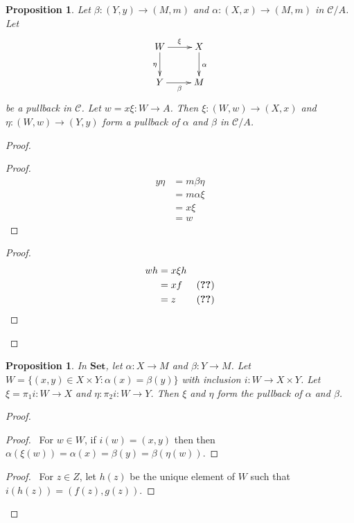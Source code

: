 \documentclass{book}
\let\qed\relax
\newtheorem{prop}[ax]{Proposition}
\theoremstyle{definition}
\newcommand{\Set}{\ensuremath{\mathbf{Set}}}
\begin{document}
\begin{prop}
\label{prop:pullback_slice_over}
Let $\beta : (Y,y) \rightarrow (M,m)$ and $\alpha : (X,x) \rightarrow (M,m)$ in $\mathcal{C} / A$. Let
\[ \xymatrix{
W \ar[r]^\xi \ar[d]_\eta & X \ar[d]^\alpha \\
Y \ar[r]_\beta & M
} \]
be a pullback in $\mathcal{C}$. Let $w = x\xi : W \rightarrow A$. Then $\xi : (W,w) \rightarrow (X,x)$ and $\eta : (W,w) \rightarrow (Y,y)$ form a pullback of $\alpha$ and $\beta$ in $\mathcal{C} / A$.
\end{prop}

\begin{proof}
\pf
{}
\begin{proof}
	\pf
	\begin{align*}
		y \eta & = m \beta \eta \\
		& = m \alpha \xi \\
		& = x \xi \\
		& = w
	\end{align*}
\end{proof}
\begin{proof}
	\pf
	\begin{align*}
		w h & = x \xi h \\
		& = xf & (\text{\stepref{4}}) \\
		& = z & (\text{\stepref{3}})
	\end{align*}
\end{proof}
\qed
\end{proof}

\begin{prop}
In $\Set$, let $\alpha : X \rightarrow M$ and $\beta : Y \rightarrow M$. Let $W = \{ (x,y) \in X \times Y : \alpha(x) = \beta(y) \}$ with inclusion $i : W \rightarrow X \times Y$. Let $\xi = \pi_1 i : W \rightarrow X$ and $\eta : \pi_2 i : W \rightarrow Y$. Then $\xi$ and $\eta$ form the pullback of $\alpha$ and $\beta$.
\end{prop}

\begin{proof}
\pf
{}
\begin{proof}
	\pf\ For $w \in W$, if $i(w) = (x,y)$ then then $\alpha(\xi(w)) = \alpha(x) = \beta(y) = \beta(\eta(w))$.
\end{proof}
\begin{proof}
	\pf\ For $z \in Z$, let $h(z)$ be the unique element of $W$ such that $i(h(z)) = (f(z),g(z))$.
\end{proof}
\qed
\end{proof}
\end{document}
